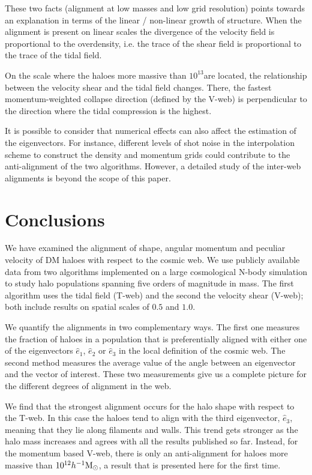 \documentclass[useAMS,usenatbib]{mn2e}
\newcommand{\hMpc}{{\ifmmode{h^{-1}{\rm Mpc}}\else{$h^{-1}$Mpc }\fi}}
\newcommand{\hMsun}{{\ifmmode{h^{-1}{\rm
        {M_{\odot}}}}\else{$h^{-1}{\rm{M_{\odot}}}$~}\fi}}
\begin{document}
These two facts (alignment at low masses and low grid resolution)
points towards an explanation in terms of the  linear / non-linear
growth of structure. When the alignment is present on linear scales
the divergence of the velocity field is proportional to the
overdensity, i.e. the trace of the shear field is proportional to the
trace of the tidal field.

On the scale where the haloes more massive than $10^{13}$\hMsun are
located, the relationship between the velocity shear and the tidal
field changes. There, the fastest momentum-weighted collapse direction
(defined by the V-web) is perpendicular to the direction where the
tidal compression is the highest. 

It is possible to consider that numerical effects can also
affect the estimation of the eigenvectors. For instance,
different levels of shot noise in the interpolation scheme to
construct the density and momentum grids could contribute to the
anti-alignment of the two algorithms. However, a detailed study of the
inter-web alignments is beyond the scope of this paper.


\section{Conclusions}
\label{sec:conclusions}

We have examined the alignment of shape, angular momentum and peculiar
velocity of DM haloes with respect to the cosmic web. We use
publicly available data from two algorithms implemented on a large
cosmological N-body simulation to study halo populations spanning five
orders of magnitude in mass. The first algorithm uses the tidal field (T-web)
and the second the velocity shear (V-web); both include results on
spatial scales of $0.5$ and $1.0$\hMpc.   

We quantify the alignments in two complementary ways. The first one
measures the fraction of haloes in a population that is preferentially
aligned with either one of the eigenvectors $\hat{e}_1$, $\hat{e}_2$
or $\hat{e}_3$ in the local definition of the cosmic web. The second
method measures the average value of the angle between an eigenvector
and the vector of interest. These two measurements give us a
complete picture for the different degrees of alignment in the web.

We find that the strongest alignment occurs for the halo shape with
respect to the T-web. In this case the haloes tend to align with the
third eigenvector, $\hat{e}_3$, meaning that they lie along filaments
and walls. This trend gets stronger as the halo mass
increases and agrees with all the results published so far. Instead,
for the momentum based V-web, there is only an anti-alignment for haloes
more massive than $10^{12}\hMsun$, a result that is presented here for
the first time. 
\end{document}
